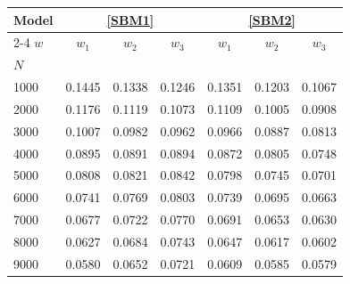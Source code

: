 \begin{tabular*}{\textwidth}{@{\extracolsep\fill}lcccccc@{}}
\toprule
\textbf{Model} & \multicolumn{3}{c}{\textbf{\eqref{SBM1}}} & \multicolumn{3}{c}{\textbf{\eqref{SBM2}}} \\
\cmidrule{2-4} \cmidrule{5-7}
\textbf{$w$} & \textbf{$w_1$} & \textbf{$w_2$} & \textbf{$w_3$} & \textbf{$w_1$} & \textbf{$w_2$} & \textbf{$w_3$} \\
\midrule
$N$ & & & & & & \\
1000 & 0.1445 & 0.1338 & 0.1246 & 0.1351 & 0.1203 & 0.1067 \\
2000 & 0.1176 & 0.1119 & 0.1073 & 0.1109 & 0.1005 & 0.0908 \\
3000 & 0.1007 & 0.0982 & 0.0962 & 0.0966 & 0.0887 & 0.0813 \\
4000 & 0.0895 & 0.0891 & 0.0894 & 0.0872 & 0.0805 & 0.0748 \\
5000 & 0.0808 & 0.0821 & 0.0842 & 0.0798 & 0.0745 & 0.0701 \\
6000 & 0.0741 & 0.0769 & 0.0803 & 0.0739 & 0.0695 & 0.0663 \\
7000 & 0.0677 & 0.0722 & 0.0770 & 0.0691 & 0.0653 & 0.0630 \\
8000 & 0.0627 & 0.0684 & 0.0743 & 0.0647 & 0.0617 & 0.0602 \\
9000 & 0.0580 & 0.0652 & 0.0721 & 0.0609 & 0.0585 & 0.0579 \\
\bottomrule
\end{tabular*}
